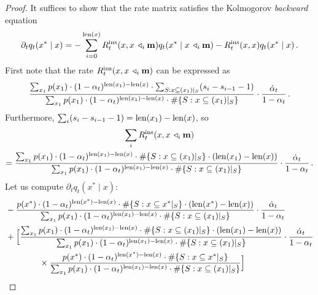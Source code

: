 \begin{proof}
    It suffices to show that the rate matrix satisfies the Kolmogorov \emph{backward} equation
    \begin{equation}
        \partial_t q_t(x^*\mid x) = -\sum^{\mathrm{len}(x)}_{i=0} R^{\rm ins}_t(x,x\,\triangleleft_{i}\mathbf{m}) q_t(x^*\mid x\,\triangleleft_{i}\mathbf{m}) - R^{\rm ins}_t(x,x) q_t(x^*\mid x)\,. \label{eq:kbe}
    \end{equation}
    First note that the rate $R^{\rm ins}_t(x, x\,\triangleleft_{i}\mathbf{m})$ can be expressed as 
    \begin{equation}
        \frac{\sum_{x_1} p(x_1) \cdot (1 - \alpha_t)^{\mathrm{len}(x_1) - \mathrm{len}(x)}\cdot \sum_{S: x\subseteq (x_1)|_S} (s_i - s_{i-1} - 1)}{\sum_{x_1} p(x_1) \cdot (1 - \alpha_t)^{\mathrm{len}(x_1) - \mathrm{len}(x)} \cdot \#\{S: x\subseteq (x_1)|_S\}}\cdot \frac{\dot{\alpha}_t}{1 - \alpha_t}\,.
    \end{equation}
    Furthermore, $\sum_i (s_i - s_{i-1} - 1) = \mathrm{len}(x_1) - \mathrm{len}(x)$, so
    \begin{multline}
        \sum_i R^{\rm ins}_t(x,x\,\triangleleft_{i}\mathbf{m}) \\
        = \frac{\sum_{x_1} p(x_1) \cdot (1 - \alpha_t)^{\mathrm{len}(x_1) - \mathrm{len}(x)}\cdot\#\{S: x\subseteq (x_1)|_S\}\cdot (\mathrm{len}(x_1) - \mathrm{len}(x))}{\sum_{x_1} p(x_1) \cdot (1 - \alpha_t)^{\mathrm{len}(x_1) - \mathrm{len}(x)} \cdot \#\{S: x\subseteq (x_1)|_S\}}\cdot \frac{\dot{\alpha}_t}{1 - \alpha_t}\,. \label{eq:sumrates}
    \end{multline}
    Let us compute $\partial_t q_t(x^*\mid x)$:
    \begin{align}
        \MoveEqLeft -\frac{p(x^*)\cdot (1 - \alpha_t)^{\length{x^*} - \length{x}}\cdot \#\{S: x\subseteq x^*|_S\}\cdot (\length{x^*}-\length{x})}{\sum_{x_1} p(x_1)\cdot (1 - \alpha_t)^{\length{x_1} - \length{x}}\cdot \#\{S: x\subseteq (x_1)|_S\}}\cdot \frac{\dot{\alpha}_t}{1 - \alpha_t} \nonumber \\ 
        \MoveEqLeft + \Bigl[\frac{\sum_{x_1} p(x_1) \cdot (1 - \alpha_t)^{\length{x_1}-\length{x}} \cdot \#\{S: x \subseteq (x_1)|_S\}\cdot (\length{x_1}-\length{x})}{\sum_{x_1} p(x_1) \cdot (1 - \alpha_t)^{\length{x_1}-\length{x}} \cdot \#\{S: x \subseteq (x_1)|_S\}}\cdot \frac{\dot{\alpha}_t}{1 - \alpha_t} \nonumber \\
        &\qquad\times \frac{p(x^*) \cdot (1 - \alpha_t)^{\length{x^*} - \length{x}} \cdot \#\{S: x \subseteq x^*|_S\}}{\sum_{x_1} p(x_1) \cdot (1 - \alpha_t)^{\length{x_1}-\length{x}} \cdot \#\{S: x \subseteq (x_1)|_S\}} \Bigr]\label{eq:partialtp}

\end{align}
\end{proof}
